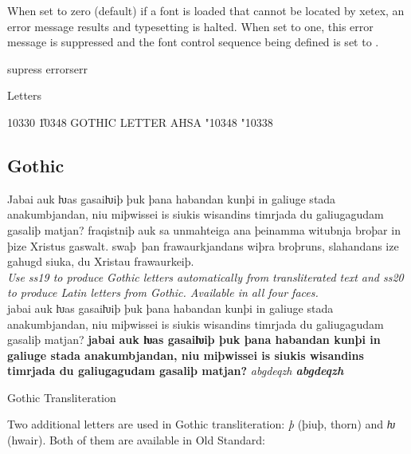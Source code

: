 \noindent When set to zero (default) if a font is loaded that cannot be
located by xetex, an error message results and typesetting is
halted. When set to one, this error message is
suppressed and the font control sequence being defined is set to
.


\begin{texexample}{supress errors}{err}
\end{texexample}

Letters

10330 \U{10348} GOTHIC LETTER AHSA \char"10348 \char"10338\\

\thorn

\subsection*{Gothic}

Jabai auk ƕas gasaiƕiþ þuk þana habandan kunþi in galiuge stada
anakumbjandan, niu miþwissei is siukis wis\-an\-dins timrjada du
galiugagudam gasaliþ matjan?  fraqistniþ auk sa unmahteiga ana
þeinamma witubnja broþar in þize Xristus gaswalt.  swaþ~þan
frawaurkjandans wiþra broþruns, slahandans ize gahugd siuka, du
Xristau fra\-waur\-keiþ.\\

{\noindent\small\itshape Use ss19 to produce Gothic letters
  automatically from transliterated text and ss20 to produce Latin
  letters from Gothic. Available in all four faces.}\\[1ex]
{jabai auk ƕas gasaiƕiþ þuk þana
  habandan kunþi in ga\-liuge stada anakumbjandan, niu miþwissei is
  siukis wis\-an\-dins timrjada du galiugagudam gasaliþ matjan?
  {\bfseries jabai auk ƕas gasaiƕiþ þuk þana habandan kunþi in
    ga\-liuge stada anakumbjandan, niu miþwissei is siukis
    wis\-an\-dins timrjada du galiugagudam gasaliþ matjan?}
  \textit{abgdeqzh \bfseries abgdeqzh}}

Gothic Transliteration

Two additional letters are used in Gothic transliteration: \textit{þ}
(þiuþ, thorn) and \textit{ƕ} (hwair). Both of them are available in Old
Standard:


